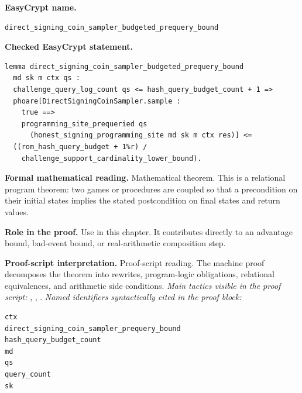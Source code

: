 \begin{formaltheorem}
\noindent\textbf{EasyCrypt name.}
\begin{lstlisting}[language=EasyCrypt,basicstyle=\ttfamily\scriptsize]
direct_signing_coin_sampler_budgeted_prequery_bound
\end{lstlisting}
\noindent\textbf{Checked EasyCrypt statement.}
\begin{lstlisting}[language=EasyCrypt,basicstyle=\ttfamily\scriptsize]
lemma direct_signing_coin_sampler_budgeted_prequery_bound
  md sk m ctx qs :
  challenge_query_log_count qs <= hash_query_budget_count + 1 =>
  phoare[DirectSigningCoinSampler.sample :
    true ==>
    programming_site_prequeried qs
      (honest_signing_programming_site md sk m ctx res)] <=
  ((rom_hash_query_budget + 1%r) /
    challenge_support_cardinality_lower_bound).
\end{lstlisting}
\noindent\textbf{Formal mathematical reading.}
Mathematical theorem. This is a relational program theorem: two games or procedures are coupled so that a precondition on their initial states implies the stated postcondition on final states and return values.

\noindent\textbf{Role in the proof.}
Use in this chapter. It contributes directly to an advantage bound, bad-event bound, or real-arithmetic composition step.

\noindent\textbf{Proof-script interpretation.}
Proof-script reading. The machine proof decomposes the theorem into rewrites, program-logic obligations, relational equivalences, and arithmetic side conditions.
\emph{Main tactics visible in the proof script:} , , .
\emph{Named identifiers syntactically cited in the proof block:}
\begin{lstlisting}[language=EasyCrypt,basicstyle=\ttfamily\scriptsize]
ctx
direct_signing_coin_sampler_prequery_bound
hash_query_budget_count
md
qs
query_count
sk
\end{lstlisting}

\end{formaltheorem}

